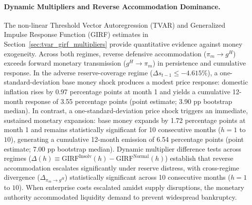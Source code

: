 \paragraph{Dynamic Multipliers and Reverse Accommodation Dominance.}
The non-linear Threshold Vector Autoregression (TVAR) and Generalized Impulse Response Function (GIRF) estimates in Section~\ref{sec:tvar_girf_multipliers} provide quantitative evidence against money exogeneity. Across both regimes, reverse defensive accommodation ($\pi_m \to g^H$) exceeds forward monetary transmission ($g^H \to \pi_m$) in persistence and cumulative response. In the adverse reserve-coverage regime ($\Delta s_{t-1} \le -4.615\%$), a one-standard-deviation base money shock produces a modest price response: domestic inflation rises by 0.97 percentage points at month 1 and yields a cumulative 12-month response of 3.55 percentage points (point estimate; 3.90 pp bootstrap median). In contrast, a one-standard-deviation price shock triggers an immediate, sustained monetary expansion: base money expands by 1.72 percentage points at month 1 and remains statistically significant for 10 consecutive months ($h=1$ to $10$), generating a cumulative 12-month emission of 6.54 percentage points (point estimate; 7.00 pp bootstrap median). Dynamic multiplier difference tests across regimes ($\Delta(h) \equiv \text{GIRF}^{\text{Insolv}}(h) - \text{GIRF}^{\text{Normal}}(h)$) establish that reverse accommodation escalates significantly under reserve distress, with cross-regime divergence ($\Delta_{\pi_m \to g^H}$) statistically significant across 10 consecutive months ($h=1$ to $10$). When enterprise costs escalated amidst supply disruptions, the monetary authority accommodated liquidity demand to prevent widespread bankruptcy.

